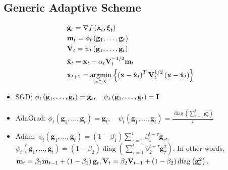 \subsection*{Generic Adaptive Scheme}
$$
\begin{aligned}
&\mathbf{g}_{t}=\nabla f\left(\mathbf{x}_{t}, \boldsymbol{\xi}_{t}\right) \\
&\mathbf{m}_{t}=\phi_{t}\left(\mathbf{g}_{1}, \ldots, \mathbf{g}_{t}\right) \\
&\boldsymbol{\mathbf{V}}_{t}=\psi_{t}\left(\mathbf{g}_{1}, \ldots, \mathbf{g}_{t}\right) \\
&\hat{\mathbf{x}}_{t}=\mathbf{x}_{t}-\alpha_{t} \boldsymbol{\mathbf{V}}_{t}^{-1 / 2} \mathbf{m}_{t} \\
&\mathbf{x}_{t+1}=\underset{\mathbf{x} \in X}{\operatorname{argmin}}\left\{\left(\mathbf{x}-\hat{\mathbf{x}}_{t}\right)^{T} \boldsymbol{\mathbf{V}}_{t}^{1 / 2}\left(\mathbf{x}-\hat{\mathbf{x}}_{t}\right)\right\}
\end{aligned}
$$
\begin{itemize}[leftmargin=*]
    \item SGD:
$
\phi_{t}\left(\mathbf{g}_{1}, \ldots, \mathbf{g}_{t}\right)=\mathbf{g}_{t}, \quad \psi_{t}\left(\mathbf{g}_{1}, \ldots, \mathbf{g}_{t}\right)=\boldsymbol{\mathbf{I}}
$
    \item AdaGrad:
$
\phi_{t}\left(\mathbf{g}_{1}, \ldots, \mathbf{g}_{t}\right)=\mathbf{g}_{t}, \quad \psi_{t}\left(\mathbf{g}_{1}, \ldots, \mathbf{g}_{t}\right)=\frac{\operatorname{diag}\left(\sum_{\tau=1}^{t} \mathbf{g}_{\tau}^{2}\right)}{t}
$
    \item Adam:
$
\phi_{t}\left(\mathbf{g}_{1}, \ldots, \mathbf{g}_{t}\right)=\left(1-\beta_{1}\right) \sum_{\tau=1}^{t} \beta_{1}^{t-\tau} \mathbf{g}_{\tau}
$, $\psi_{t}\left(\mathbf{g}_{1}, \ldots, \mathbf{g}_{t}\right)=\left(1-\beta_{2}\right) \operatorname{diag}\left(\sum_{\tau=1}^{t} \beta_{2}^{t-\tau} \mathbf{g}_{\tau}^{2}\right)$. In other words, $\mathbf{m}_{t}=\beta_{1} \mathbf{m}_{t-1}+\left(1-\beta_{1}\right) \mathbf{g}_{t}, \boldsymbol{\mathbf{V}}_{t}=\beta_{2} \boldsymbol{\mathbf{V}}_{t-1}+\left(1-\beta_{2}\right) \operatorname{diag}\left(\mathbf{g}_{t}^{2}\right)$.
\end{itemize}






